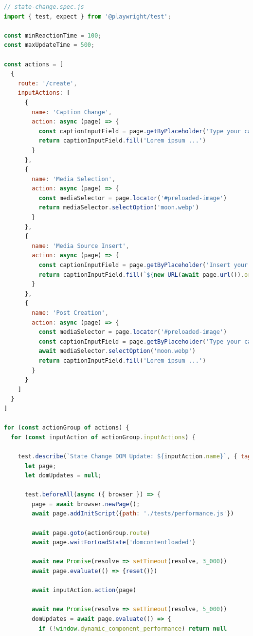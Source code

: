\documentclass[a4paper, 10pt]{article}
\begin{document}
\begin{lstlisting}[caption={Test file for component update times}, label={lst:state-change-spec}, language=JavaScript]
// state-change.spec.js
import { test, expect } from '@playwright/test';

const minReactionTime = 100;
const maxUpdateTime = 500;

const actions = [
  {
    route: '/create',
    inputActions: [
      {
        name: 'Caption Change',
        action: async (page) => {
          const captionInputField = page.getByPlaceholder('Type your caption here')
          return captionInputField.fill('Lorem ipsum ...')
        }
      },
      {
        name: 'Media Selection',
        action: async (page) => {
          const mediaSelector = page.locator('#preloaded-image')
          return mediaSelector.selectOption('moon.webp')
        }
      },
      {
        name: 'Media Source Insert',
        action: async (page) => {
          const captionInputField = page.getByPlaceholder('Insert your media URL here...')
          return captionInputField.fill(`${new URL(await page.url()).origin}/abstract-circles.webp`)
        }
      },
      {
        name: 'Post Creation',
        action: async (page) => {
          const mediaSelector = page.locator('#preloaded-image')
          const captionInputField = page.getByPlaceholder('Type your caption here')
          await mediaSelector.selectOption('moon.webp')
          return captionInputField.fill('Lorem ipsum ...')
        }
      }
    ]
  }
]

for (const actionGroup of actions) {
  for (const inputAction of actionGroup.inputActions) {

    test.describe(`State Change DOM Update: ${inputAction.name}`, { tag: [`@${inputAction.name.replace(/\s/g, '')}`, '@stateChange'] }, () => {
      let page;
      let domUpdates = null;

      test.beforeAll(async ({ browser }) => {
        page = await browser.newPage();
        await page.addInitScript({path: './tests/performance.js'})

        await page.goto(actionGroup.route)
        await page.waitForLoadState('domcontentloaded')

        await new Promise(resolve => setTimeout(resolve, 3_000))
        await page.evaluate(() => {reset()})

        await inputAction.action(page)

        await new Promise(resolve => setTimeout(resolve, 5_000))
        domUpdates = await page.evaluate(() => {
          if (!window.dynamic_component_performance) return null


\end{lstlisting}
\end{document}
